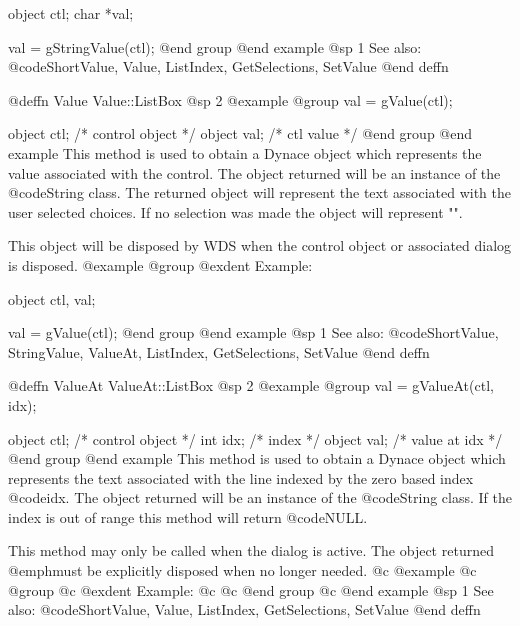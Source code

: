 {object  ctl;
char    *val;

val = gStringValue(ctl);
@end group
@end example
@sp 1
See also:  @code{ShortValue, Value, ListIndex, GetSelections, SetValue}
@end deffn










@deffn {Value} Value::ListBox
@sp 2
@example
@group
val = gValue(ctl);

object  ctl;   /*  control object  */
object  val;   /*  ctl value       */
@end group
@end example
This method is used to obtain a Dynace object which represents the value
associated with the control.  The object returned will be an instance of
the @code{String} class.  The returned object will represent the text
associated with the user selected choices.  If no selection was made
the object will represent "".

This object will be disposed by WDS when the control object or
associated dialog is disposed.
@example
@group
@exdent Example:

object  ctl, val;

val = gValue(ctl);
@end group
@end example
@sp 1
See also:  @code{ShortValue, StringValue, ValueAt, ListIndex, GetSelections, SetValue}
@end deffn









@deffn {ValueAt} ValueAt::ListBox
@sp 2
@example
@group
val = gValueAt(ctl, idx);

object  ctl;   /*  control object  */
int     idx;   /*  index           */
object  val;   /*  value at idx    */
@end group
@end example
This method is used to obtain a Dynace object which represents the text
associated with the line indexed by the zero based index @code{idx}.
The object returned will be an instance of the @code{String} class.  If
the index is out of range this method will return @code{NULL}.

This method may only be called when the dialog is active.  The object
returned @emph{must} be explicitly disposed when no longer needed.
@c @example
@c @group
@c @exdent Example:
@c
@c @end group
@c @end example
@sp 1
See also:  @code{ShortValue, Value, ListIndex, GetSelections, SetValue}
@end deffn








}
